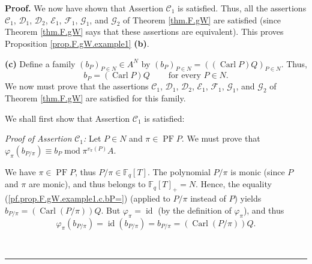 \documentclass[numbers=enddot,12pt,final,onecolumn,notitlepage]{scrartcl}%
\theoremstyle{definition}
\newenvironment{proof}[1][Proof]{\noindent\textbf{#1.} }{\ \rule{0.5em}{0.5em}}
\begin{document}
\begin{proof}
We now have shown that Assertion $\mathcal{C}_{1}$ is satisfied. Thus, all the
assertions $\mathcal{C}_{1}$, $\mathcal{D}_{1}$, $\mathcal{D}_{2}$,
$\mathcal{E}_{1}$, $\mathcal{F}_{1}$, $\mathcal{G}_{1}$, and $\mathcal{G}_{2}$
of Theorem \ref{thm.F.gW} are satisfied (since Theorem \ref{thm.F.gW} says
that these assertions are equivalent). This proves Proposition
\ref{prop.F.gW.example1} \textbf{(b)}.

\textbf{(c)} Define a family $\left(  b_{P}\right)  _{P\in N}\in A^{N}$ by
$\left(  b_{P}\right)  _{P\in N}=\left(  \left(  \operatorname*{Carl}P\right)
Q\right)  _{P\in N}$. Thus,%
\begin{equation}
b_{P}=\left(  \operatorname*{Carl}P\right)  Q\ \ \ \ \ \ \ \ \ \ \text{for
every }P\in N. \label{pf.prop.F.gW.example1.c.bP=}%
\end{equation}
We now must prove that the assertions $\mathcal{C}_{1}$, $\mathcal{D}_{1}$,
$\mathcal{D}_{2}$, $\mathcal{E}_{1}$, $\mathcal{F}_{1}$, $\mathcal{G}_{1}$,
and $\mathcal{G}_{2}$ of Theorem \ref{thm.F.gW} are satisfied for this family.

We shall first show that Assertion $\mathcal{C}_{1}$ is satisfied:

\textit{Proof of Assertion }$\mathcal{C}_{1}$\textit{:} Let $P\in N$ and
$\pi\in\operatorname*{PF}P$. We must prove that $\varphi_{\pi}\left(
b_{P/\pi}\right)  \equiv b_{P}\operatorname{mod}\pi^{v_{\pi}\left(  P\right)
}A$.

We have $\pi\in\operatorname*{PF}P$, thus $P/\pi\in\mathbb{F}_{q}\left[
T\right]  $. The polynomial $P/\pi$ is monic (since $P$ and $\pi$ are monic),
and thus belongs to $\mathbb{F}_{q}\left[  T\right]  _{+}=N$. Hence, the
equality (\ref{pf.prop.F.gW.example1.c.bP=}) (applied to $P/\pi$ instead of
$P$) yields $b_{P/\pi}=\left(  \operatorname*{Carl}\left(  P/\pi\right)
\right)  Q$. But $\varphi_{\pi}=\operatorname*{id}$ (by the definition of
$\varphi_{\pi}$), and thus%
\begin{equation}
\varphi_{\pi}\left(  b_{P/\pi}\right)  =\operatorname*{id}\left(  b_{P/\pi
}\right)  =b_{P/\pi}=\left(  \operatorname*{Carl}\left(  P/\pi\right)
\right)  Q. \label{pf.prop.F.gW.example1.c.1}%
\end{equation}



\end{proof}
\end{document}
